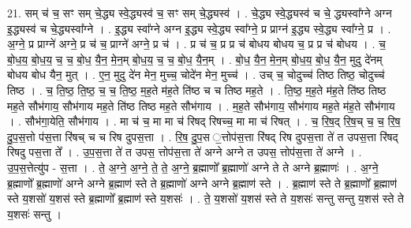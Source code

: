 \documentclass[17pt]{extarticle}
\begin{document}
21. सम् च॑ च॒ सꣳ सम् चे॒द्ध्य स्वे॒द्ध्यस्व॑ च॒ सꣳ सम् चे॒द्ध्यस्व॑ । . चे॒द्ध्य स्वे॒द्ध्यस्व॑ च चे॒ द्ध्यस्वा᳚ग्ने अग्न इ॒द्ध्यस्व॑ च चे॒द्ध्यस्वा᳚ग्ने । . इ॒द्ध्य स्वा᳚ग्ने अग्न इ॒द्ध्य स्वे॒द्ध्य स्वा᳚ग्ने॒ प्र प्राग्न॑ इ॒द्ध्य स्वे॒द्ध्य स्वा᳚ग्ने॒ प्र । . अ॒ग्ने॒ प्र प्राग्ने॑ अग्ने॒ प्र च॑ च॒ प्राग्ने॑ अग्ने॒ प्र च॑ । . प्र च॑ च॒ प्र प्र च॑ बोधय बोधय च॒ प्र प्र च॑ बोधय । . च॒ बो॒ध॒य॒ बो॒ध॒य॒ च॒ च॒ बो॒ध॒ यै॒न॒ मे॒न॒म् बो॒ध॒य॒ च॒ च॒ बो॒ध॒ यै॒न॒म् । . बो॒ध॒ यै॒न॒ मे॒न॒म् बो॒ध॒य॒ बो॒ध॒ यै॒न॒ मुदु दे॑नम् बोधय बोध यैन॒ मुत् । . ए॒न॒ मुदु दे॑न मेन॒ मुच्च॒ चोदे॑न मेन॒ मुच्च॑ । . उच् च॒ चोदुच्च॑ तिष्ठ तिष्ठ॒ चोदुच्च॑ तिष्ठ । . च॒ ति॒ष्ठ॒ ति॒ष्ठ॒ च॒ च॒ ति॒ष्ठ॒ म॒ह॒ते म॑ह॒ते ति॑ष्ठ च च तिष्ठ मह॒ते । . ति॒ष्ठ॒ म॒ह॒ते म॑ह॒ते ति॑ष्ठ तिष्ठ मह॒ते सौभ॑गाय॒ सौभ॑गाय मह॒ते ति॑ष्ठ तिष्ठ मह॒ते सौभ॑गाय । . म॒ह॒ते सौभ॑गाय॒ सौभ॑गाय मह॒ते म॑ह॒ते सौभ॑गाय । . सौभ॑गा॒येति॒ सौभ॑गाय । . मा च॑ च॒ मा मा च॑ रिषद् रिषच्च॒ मा मा च॑ रिषत् । . च॒ रि॒ष॒द् रि॒ष॒च् च॒ च॒ रि॒ष॒ दु॒प॒स॒त्तो प॑स॒त्ता रि॑षच् च च रिष दुपस॒त्ता । . रि॒ष॒ दु॒प॒स ॒त्तोप॑स॒त्ता रि॑षद् रिष दुपस॒त्ता ते॑ त उपस॒त्ता रि॑षद् रिषदु पस॒त्ता ते᳚ । . उ॒प॒स॒त्ता ते॑ त उपस॒ त्तोप॑स॒त्ता ते॑ अग्ने अग्ने त उपस॒ त्तोप॑स॒त्ता ते॑ अग्ने । . उ॒प॒स॒त्तेत्यु॑प - स॒त्ता । . ते॒ अ॒ग्ने॒ अ॒ग्ने॒ ते॒ ते॒ अ॒ग्ने॒ ब्र॒ह्माणो᳚ ब्र॒ह्माणो॑ अग्ने ते ते अग्ने ब्र॒ह्माणः॑ । . अ॒ग्ने॒ ब्र॒ह्माणो᳚ ब्र॒ह्माणो॑ अग्ने अग्ने ब्र॒ह्माण॑ स्ते ते ब्र॒ह्माणो॑ अग्ने अग्ने ब्र॒ह्माण॑ स्ते । . ब्र॒ह्माण॑ स्ते ते ब्र॒ह्माणो᳚ ब्र॒ह्माण॑ स्ते य॒शसो॑ य॒शस॑ स्ते ब्र॒ह्माणो᳚ ब्र॒ह्माण॑ स्ते य॒शसः॑ । . ते॒ य॒शसो॑ य॒शस॑ स्ते ते य॒शसः॑ सन्तु सन्तु य॒शस॑ स्ते ते य॒शसः॑ सन्तु । \newline
\end{document}
